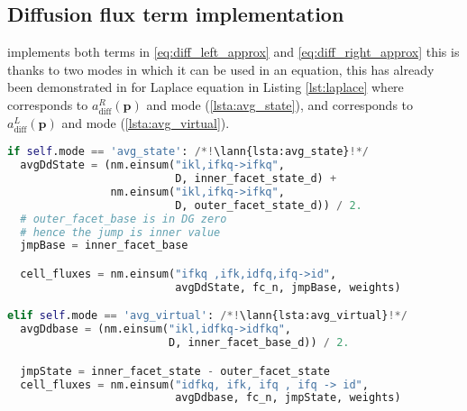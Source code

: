 \subsection{Diffusion flux term implementation}
\label{se:diff_flux_term_imp}
 implements both terms in 
\eqref{eq:diff_left_approx} and \eqref{eq:diff_right_approx} this is thanks to two modes 
in which it can be used in an equation, this has already been demonstrated in for Laplace 
equation in Listing \ref{lst:laplace} where  corresponds to $a^R_\mathrm{diff}(\mathbf{p})$ and mode  
(\ref{lsta:avg_state}), and  
corresponds to $a^L_\mathrm{diff}(\mathbf{p})$ and mode  
(\ref{lsta:avg_virtual}).
\setcounter{lstannotation}{0}
\begin{lstlisting}[language=Python, caption=Computation of diffusion cell 
fluxes]
if self.mode == 'avg_state': /*!\lann{lsta:avg_state}!*/
  avgDdState = (nm.einsum("ikl,ifkq->ifkq", 
                          D, inner_facet_state_d) +
                nm.einsum("ikl,ifkq->ifkq", 
                          D, outer_facet_state_d)) / 2.
  # outer_facet_base is in DG zero 
  # hence the jump is inner value
  jmpBase = inner_facet_base

  cell_fluxes = nm.einsum("ifkq ,ifk,idfq,ifq->id", 
                          avgDdState, fc_n, jmpBase, weights)

elif self.mode == 'avg_virtual': /*!\lann{lsta:avg_virtual}!*/
  avgDdbase = (nm.einsum("ikl,idfkq->idfkq",
                         D, inner_facet_base_d)) / 2.

  jmpState = inner_facet_state - outer_facet_state
  cell_fluxes = nm.einsum("idfkq, ifk, ifq , ifq -> id", 
                          avgDdbase, fc_n, jmpState, weights)
\end{lstlisting}


